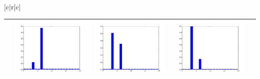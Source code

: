\documentclass[twoside,11pt]{article}
\begin{document}
\begin{table}[t]
\begin{center}
{\begin{tabular}{|c|r|c|}
\begin{tabular}{ccccc}
&
\includegraphics[width=\barw\textwidth]{visualize_dist_paMedLDAave_6/6_512} &
\includegraphics[width=\barw\textwidth]{visualize_dist_paMedLDAave_6/6_4096} &
\includegraphics[width=\barw\textwidth]{visualize_dist_paMedLDAave_6/6_11269} \\
\hline
\end{tabular} \\


\end{tabular}}
\end{center}
\end{table}
\end{document}
